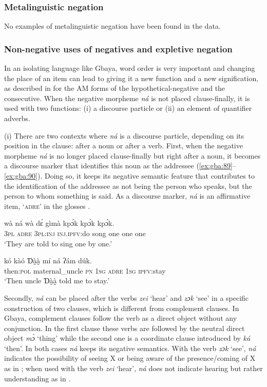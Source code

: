 \documentclass[output=paper,colorlinks=true, citecolor=brown]{langscibook}
\begin{document}
\subsubsection{Metalinguistic negation}\label{sec:gba:4.6.2}

No examples of metalinguistic negation have been found in the data.

\subsubsection{Non-negative uses of negatives and expletive negation}\label{sec:gba:4.6.3}

In an isolating language like Gbaya, word order is very important and changing the place of an item can lead to giving it a new function and a new signification, as described in  for the AM forms of the hypothetical{}-negative and the consecutive. 
When the negative morpheme \textit{ná} is not placed clause-finally, it is used with two functions: (i) a discourse particle or (ii) an element of quantifier adverbs.

{(i)} There are two contexts where \textit{ná} is a discourse particle, depending on its position in the clause: after a noun or after a verb. First, when the negative morpheme \textit{ná} is no longer placed clause-finally but right after a noun, it becomes a discourse marker that identifies this noun as the addressee (\ref{ex:gba:89}--\ref{ex:gba:90}). Doing so, it keeps its negative semantic feature that contributes to the identification of the addressee as not being the person who speaks, but the person to whom something is said. As a discourse marker, \textit{ná} is an affirmative item, ‘\textsc{adre}’ in the glosses \citep[see][]{Roulon-Doko2008}.


\ea\label{ex:gba:89}
    \gll wà ná wà dɛ́ gìmà kpɔ́k kpɔ́k kpɔ́k. \\ 
         \textsc{3pl} \textsc{adre} \textsc{3pl:inj} \textsc{inj.ipfv}:do song one one one \\
    \glt ‘They are told to sing one by one.’
\z 

\ea\label{ex:gba:90}
    \gll kó kàó Ɗà̰à̰   mí ná ʔám dúk.  \\ 
         then:\textsc{pol} maternal\_uncle \textsc{pn} \textsc{1sg} \textsc{adre} \textsc{1sg} \textsc{ipfv}:stay \\
    \glt ‘Then uncle \MakeUppercase{ɗ}à̰à̰   told me to stay.’
\z 

Secondly, \textit{ná} can be placed after the verbs \textit{zei} ‘hear’ and \textit{zɔk} ‘see’ in a specific construction of two clauses, which is different from complement clauses. In Gbaya, complement clauses follow the verb as a direct object without any conjunction. In the first clause these verbs are followed by the neutral direct object \textit{mɔ̀} ‘thing’ while the second one is a coordinate clause introduced by \textit{ká} ‘then’. In both cases \textit{ná} keeps its negative semantics. With the verb \textit{zɔk} ‘see’, \textit{ná} indicates the possibility of seeing X or being aware of the presence\slash coming of X as in ; when used with the verb \textit{zei} ‘hear’, \textit{ná} does not indicate hearing but rather understanding as in .
\end{document}
